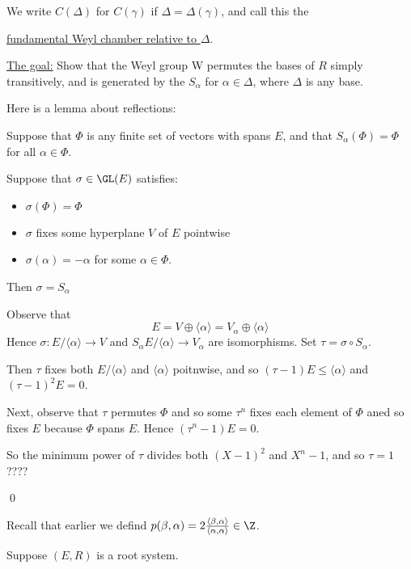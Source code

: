 \documentclass[x11names,reqno,14pt]{extarticle}
\begin{document}
We write $C(\Delta)$ for $C(\gamma)$ if $\Delta = \Delta(\gamma)$, and call this the 

\underline{fundamental Weyl chamber relative to $\Delta$}. 

\underline{The goal:} Show that the Weyl group W permutes the bases of $R$ simply transitively, and is generated by the $S_\alpha$ for $\alpha\in\Delta$, where $\Delta$ is any base. 

Here is a lemma about reflections:

\lem

Suppose that $\Phi$ is any finite set of vectors with spans $E$, and that $S_\alpha(\Phi) = \Phi$ for all $\alpha\in\Phi$. 

Suppose that $\sigma\in\GL(E)$ satisfies: 

\begin{itemize}

\item $\sigma(\Phi)=\Phi$

\item $\sigma$ fixes some hyperplane $V$ of $E$ pointwise

\item $\sigma(\alpha)=-\alpha$ for some $\alpha\in \Phi$. 

\end{itemize}

Then $\sigma=S_\alpha$

\proof

Observe that 
\[
E = V\oplus\langle\alpha\rangle = V_\alpha\oplus\langle\alpha\rangle
\]
Hence $\sigma:E/\langle\alpha\rangle\to V$ and $S_\alpha E/\langle\alpha\rangle\to V_\alpha$ are isomorphisms. Set $\tau = \sigma\circ S_\alpha$. 

Then $\tau$ fixes both $E/\langle\alpha\rangle$ and $\langle\alpha\rangle$ poitnwise, and so $(\tau - 1)E \leq \langle\alpha\rangle$ and $(\tau-1)^2E = 0$. 

Next, observe that $\tau$ permutes $\Phi$ and so some $\tau^n$ fixes each element of $\Phi$ aned so fixes $E$ because $\Phi$ spans $E$. Hence $(\tau^n-1)E = 0$. 

So the minimum power of $\tau$ divides both $(X-1)^2$ and $X^n - 1$, and so $\tau = 1$ ????

\qed

Recall that earlier we defind $p(\beta,\alpha) = 2\frac{\langle\beta,\alpha\rangle}{\langle\alpha,\alpha\rangle}\in\Z$. 

\prop

Suppose $(E,R)$ is a root system. 
\end{document}
